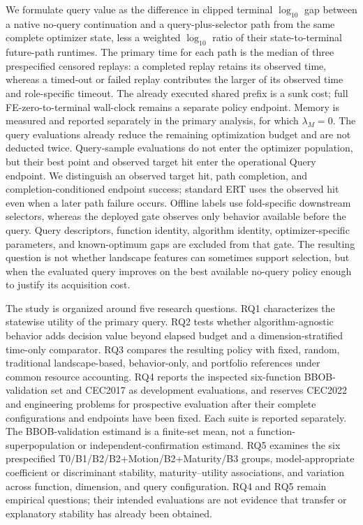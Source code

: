 We formulate query value as the difference in clipped terminal $\log_{10}$ gap between a native no-query continuation and a query-plus-selector path from the same complete optimizer state, less a weighted $\log_{10}$ ratio of their state-to-terminal future-path runtimes. The primary time for each path is the median of three prespecified censored replays: a completed replay retains its observed time, whereas a timed-out or failed replay contributes the larger of its observed time and role-specific timeout. The already executed shared prefix is a sunk cost; full FE-zero-to-terminal wall-clock remains a separate policy endpoint. Memory is measured and reported separately in the primary analysis, for which $\lambda_M=0$. The query evaluations already reduce the remaining optimization budget and are not deducted twice. Query-sample evaluations do not enter the optimizer population, but their best point and observed target hit enter the operational Query endpoint. We distinguish an observed target hit, path completion, and completion-conditioned endpoint success; standard ERT uses the observed hit even when a later path failure occurs. Offline labels use fold-specific downstream selectors, whereas the deployed gate observes only behavior available before the query. Query descriptors, function identity, algorithm identity, optimizer-specific parameters, and known-optimum gaps are excluded from that gate. The resulting question is not whether landscape features can sometimes support selection, but when the evaluated query improves on the best available no-query policy enough to justify its acquisition cost.

The study is organized around five research questions. RQ1 characterizes the statewise utility of the primary \query{} query. RQ2 tests whether algorithm-agnostic behavior adds decision value beyond elapsed budget and a dimension-stratified time-only comparator. RQ3 compares the resulting policy with fixed, random, traditional landscape-based, behavior-only, and portfolio references under common resource accounting. RQ4 reports the inspected six-function BBOB-validation set and CEC2017 as development evaluations, and reserves CEC2022 and engineering problems for prospective evaluation after their complete configurations and endpoints have been fixed. Each suite is reported separately. The BBOB-validation estimand is a finite-set mean, not a function-superpopulation or independent-confirmation estimand. RQ5 examines the six prespecified T0/B1/B2/B2+Motion/B2+Maturity/B3 groups, model-appropriate coefficient or discriminant stability, maturity--utility associations, and variation across function, dimension, and query configuration. RQ4 and RQ5 remain empirical questions; their intended evaluations are not evidence that transfer or explanatory stability has already been obtained.

